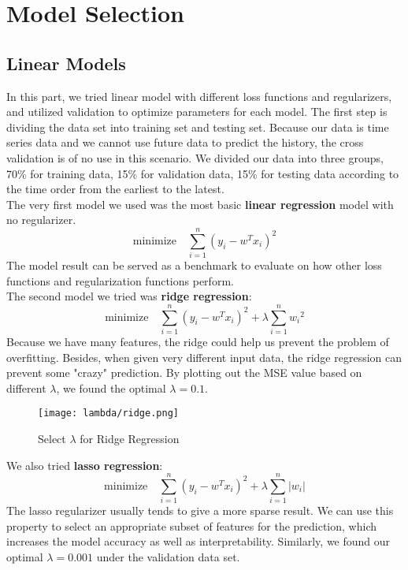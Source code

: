 \documentclass[fleqn,10pt]{SelfArx} %
\begin{document}

\section{Model Selection}
\subsection{Linear Models}
In this part, we tried linear model with different loss functions and regularizers, and utilized validation to optimize parameters for each model. The first step is dividing the data set into training set and testing set. Because our data is time series data and we cannot use future data to predict the history, the cross validation is of no use in this scenario. We divided our data into three groups, 70\% for training data, 15\% for validation data, 15\% for testing data according to the time order from the earliest to the latest. \\

\noindent
The very first model we used was the most basic \textbf{linear regression} model with no regularizer. 
$$ \text{minimize} \quad \sum_{i=1}^{n} (y_i - w^Tx_i)^2$$
The model result can be served as a benchmark to evaluate on how other loss functions and regularization functions perform.\\

\noindent
The second model we tried was \textbf{ridge regression}:
$$ \text{minimize} \quad \sum_{i=1}^{n} (y_i - w^Tx_i)^2 + \lambda \sum_{i=1}^{n} {w_i}^2$$
Because we have many features, the ridge could help us prevent the problem of overfitting. Besides, when given very different input data, the ridge regression can prevent some "crazy" prediction. By plotting out the MSE value based on different $\lambda$, we found the optimal $\lambda= 0.1$.  \\

\begin{figure}[ht]\centering %
\texttt{[image: lambda/ridge.png]}
\caption{Select $\lambda$ for Ridge Regression}
\label{fig:view}
\end{figure}

\noindent
We also tried \textbf{lasso regression}:
$$ \text{minimize} \quad \sum_{i=1}^{n} (y_i - w^Tx_i)^2 + \lambda \sum_{i=1}^{n} |w_i|$$
The lasso regularizer usually tends to give a more sparse result. We can use this property to select an appropriate subset of features for the prediction, which increases the model accuracy as well as interpretability. Similarly, we found our optimal $\lambda = 0.001$ under the validation data set.\\
\end{document}
